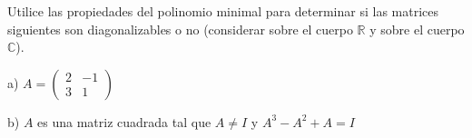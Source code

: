  \begin{exercise} 

\item
 \noindent
 Utilice las propiedades del polinomio minimal para determinar si las matrices siguientes son diagonalizables o no (considerar sobre el cuerpo $\mathbb{R}$ y sobre el cuerpo $\mathbb{C}$).
 
\bigskip
 
 
a) $A=\left(\begin{array}{cc}2 & -1 \\3 & 1
\end{array}
 \right)$
 
 \bigskip
 
b) $A$ es una matriz cuadrada tal que $A \neq I$ y $A^3-A^2+A=I$
\end{exercise}  
 
\newpage



\bigskip


